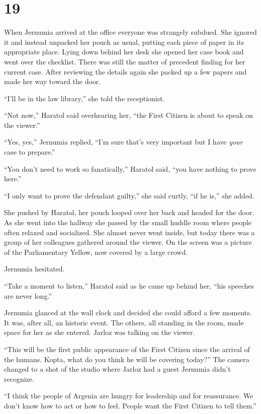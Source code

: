 
\chapter{19}

When Jernumia arrived at the office everyone was strangely subdued. She ignored it and instead
unpacked her pouch as usual, putting each piece of paper in its appropriate place. Lying down
behind her desk she opened her case book and went over the checklist. There was still the matter
of precedent finding for her current case. After reviewing the details again she packed up a few
papers and made her way toward the door.

``I'll be in the law library,'' she told the receptionist.

``Not now,'' Haratol said overhearing her, ``the First Citizen is about to speak on
the viewer.''

``Yes, yes,'' Jernumia replied, ``I'm sure that's very important but I have \emph{your} case to
prepare.''

``You don't need to work so fanatically,'' Haratol said, ``you have nothing to prove here.''

``I only want to prove the defendant guilty,'' she said curtly, ``if he is,'' she added.

She pushed by Haratol, her pouch looped over her back and headed for the door. As she went into
the hallway she passed by the small huddle room where people often relaxed and socialized. She
almost never went inside, but today there was a group of her colleagues gathered around the
viewer. On the screen was a picture of the Parliamentary Yellow, now covered by a large crowd.

Jernumia hesitated.

``Take a moment to listen,'' Haratol said as he came up behind her, ``his speeches are never
long.''

Jernumia glanced at the wall clock and decided she could afford a few moments. It was, after
all, an historic event. The others, all standing in the room, made space for her as she entered.
Jarloz was talking on the viewer.

``This will be the first public appearance of the First Citizen since the arrival of the humans.
Kopta, what do you think he will be covering today?'' The camera changed to a shot of the studio
where Jarloz had a guest Jernumia didn't recognize.

``I think the people of Argenia are hungry for leadership and for reassurance. We don't know how
to act or how to feel. People want the First Citizen to tell them.''

